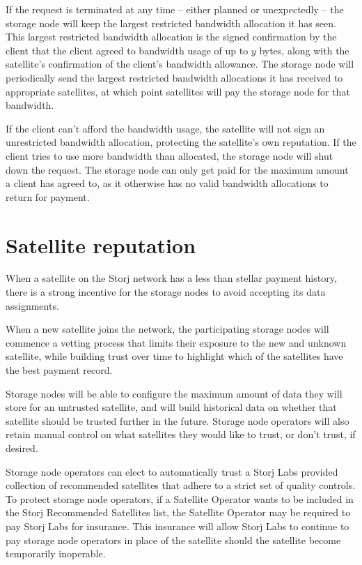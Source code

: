 \documentclass[11pt,fleqn,openany]{book}
\begin{document}
If the request is terminated at any time --
either planned or unexpectedly --
the storage node will keep the largest restricted bandwidth allocation it has
seen.
This largest restricted bandwidth allocation is the signed confirmation
by the client that the client agreed to bandwidth usage of up to $y$
bytes, along with the satellite's confirmation of the client's bandwidth
allowance.
The storage node will periodically send the largest restricted bandwidth
allocations it has received to appropriate satellites, at which point
satellites will pay the storage node for that bandwidth.

If the client can't afford the bandwidth usage, the satellite will not sign an
unrestricted bandwidth allocation, protecting the satellite's own reputation.
If the client tries to use more bandwidth than allocated,
the storage node will shut down the request.
The storage node can only get paid for the maximum amount a client has agreed
to,
as it otherwise has no valid bandwidth allocations to return for
payment.

\section{Satellite reputation}

When a satellite on the Storj network has a less than stellar payment history,
there is a strong incentive for the storage nodes to avoid accepting its data
assignments.

When a new satellite joins the network, the participating storage nodes will
commence a vetting process that limits their exposure to the new and unknown
satellite, while building trust over time to highlight which of the
satellites have the best payment record.

Storage nodes will be able to configure the maximum amount of data they will
store for an untrusted satellite, and will build historical data on whether
that satellite should be trusted further in the future.
Storage node operators will also retain manual control on what satellites they
would like to trust, or don’t trust, if desired.

Storage node operators can elect to automatically trust a Storj Labs
provided collection of recommended satellites that adhere to a strict set of
quality controls.
To protect storage node operators, if a Satellite Operator wants to be
included in the Storj Recommended Satellites list, the Satellite Operator may
be required to pay Storj Labs for insurance. This insurance will allow Storj
Labs to continue to pay storage node operators in place of the satellite should
the satellite become temporarily inoperable.
\end{document}
